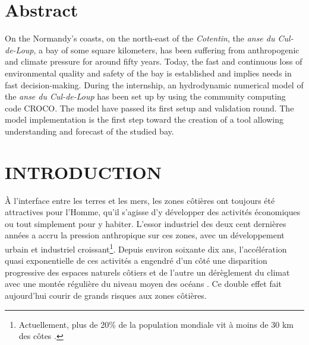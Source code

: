 \documentclass[10pt,a4paper,titlepage]{article}
\begin{document}
\section*{Abstract}
On the Normandy's coasts, on the north-east of the \textit{Cotentin}, the \textit{anse du Cul-de-Loup}, a bay of some square kilometers, has been suffering from anthropogenic and climate pressure for around fifty years.
Today, the fast and continuous loss of environmental quality and safety of the bay is established and implies needs in fast decision-making.
During the internship, an hydrodynamic numerical model of the \textit{anse du Cul-de-Loup} has been set up by using the community computing code CROCO.
The model have passed its first setup and validation round.
The model implementation is the first step toward the creation of a tool allowing understanding and forecast of the studied bay.

\newpage

    \tableofcontents
    \newpage

    \section{INTRODUCTION}
    \label{sec:introduction}



    À l'interface entre les terres et les mers, les zones côtières ont toujours été attractives pour l'Homme, qu'il s'agisse d'y développer des activités économiques ou tout simplement pour y habiter.
    L’essor industriel des deux cent dernières années a accru la pression anthropique sur ces zones, avec un développement urbain et industriel croissant\footnote{Actuellement, plus de 20\% de la population mondiale vit à moins de 30 km des côtes \parencite{senat2015}.}.
    Depuis environ soixante dix ans, l'accélération quasi exponentielle de ces activités a engendré d'un côté une disparition progressive des espaces naturels côtiers et de l'autre un dérèglement du climat avec une montée régulière du niveau moyen des océans \parencite{ipcc2021}. Ce double effet fait aujourd'hui courir de grands risques aux zones côtières.
\end{document}
